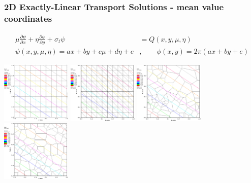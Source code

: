 \documentclass[compress,10pt]{beamer}
\begin{document}
\subsection{}
\begin{frame}[t]\frametitle{2D Exactly-Linear Transport Solutions - mean value coordinates}
\begin{block}{}
\begin{equation*}
\begin{aligned}
\mu \frac{\partial  \psi}{\partial x} + \eta \frac{\partial  \psi}{\partial y} + \sigma_t \psi &= Q(x,y,\mu,\eta) \\
\psi (x,y,\mu,\eta) = a x + b y + c \mu + d \eta + e& , \qquad  \phi (x,y) = 2 \pi \left(   a x + b y  + e  \right)
\end{aligned}
\end{equation*}
\end{block}
\centering
\includegraphics[width=0.25\textwidth]{images/cart_MV_k1.eps} 
\includegraphics[width=0.25\textwidth]{images/tri_MV_k1.eps} 
\includegraphics[width=0.25\textwidth]{images/shes_poly_MV_k1.eps} 
\vspace{0.2cm}
\includegraphics[width=0.25\textwidth]{images/smooth_poly_MV_k1.eps} 

\end{frame}
\end{document}
